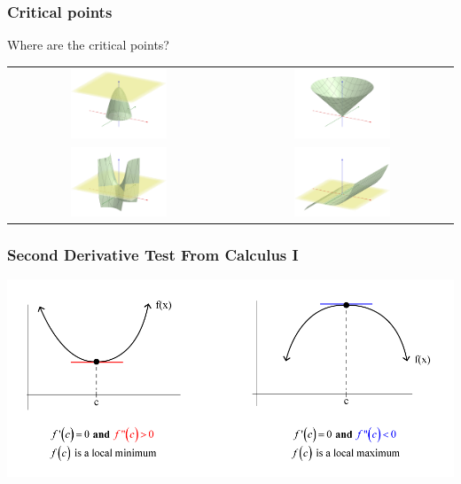 \documentclass[10pt]{beamer}
\begin{document}
\begin{frame}
\frametitle{Critical points}
Where are the critical points?
\begin{tabular}{cc}
\includegraphics[width=0.45\textwidth]{max2.png}&\includegraphics[width=0.45\textwidth]{cone.png}\\
\includegraphics[width=0.45\textwidth]{saddle2.png}&\includegraphics[width=0.45\textwidth]{fail32.png}
\end{tabular}
\end{frame}

\begin{frame}
\frametitle{Second Derivative Test From Calculus I}
\centering
\includegraphics[width=\textwidth]{secondderivativetest.png}
\end{frame}
\end{document}
